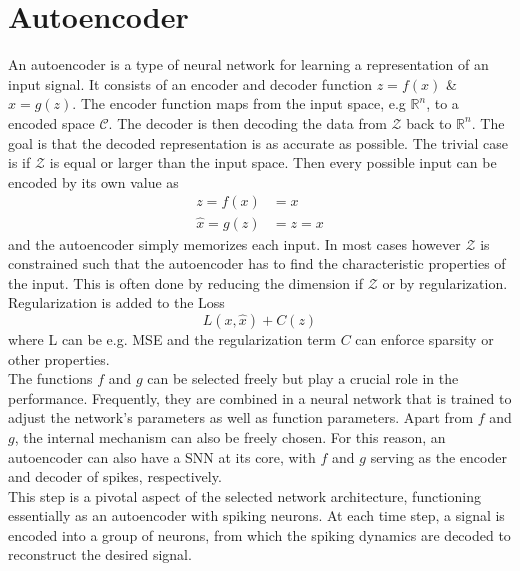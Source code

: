 \section{Autoencoder}
An autoencoder is a type of neural network for learning a representation of an input signal. It consists of an encoder and decoder function $z =f(x)$ \& $\hat{x} = g(z)$. The encoder function maps from the input space, e.g $\mathbb{R}^n$, to a encoded space $\mathcal{C}$. The decoder is then decoding the data from $\mathcal{Z}$ back to $\mathbb{R}^n$. The goal is that the decoded representation is as accurate as possible. The trivial case is if $\mathcal{Z}$ is equal or larger than the input space. Then every possible input can be encoded by its own value as
\begin{equation}
\begin{aligned}
 	z = f(x) &= x\\
 	\hat{x} = g(z) &= z = x
\end{aligned}
\end{equation}
and the autoencoder simply memorizes each input. In most cases however $\mathcal{Z}$ is constrained such that the autoencoder has to find the characteristic properties of the input. This is often done by reducing the dimension if $\mathcal{Z}$ or by regularization. Regularization is added to the Loss
\begin{equation}
	L(x,\hat{x}) + C(z)
\end{equation}
where L can be e.g. MSE and the regularization term $C$ can enforce sparsity or other properties\cite{goodfellow_deep_2016}.\\
The functions $f$ and $g$ can be selected freely but play a crucial role in the performance. Frequently, they are combined in a neural network that is trained to adjust the network's parameters as well as function parameters. Apart from $f$ and $g$, the internal mechanism can also be freely chosen. For this reason, an autoencoder can also have a \ac{SNN} at its core, with $f$ and $g$ serving as the encoder and decoder of spikes, respectively.\\
This step is a pivotal aspect of the selected network architecture, functioning essentially as an autoencoder with spiking neurons. At each time step, a signal is encoded into a group of neurons, from which the spiking dynamics are decoded to reconstruct the desired signal.\\

